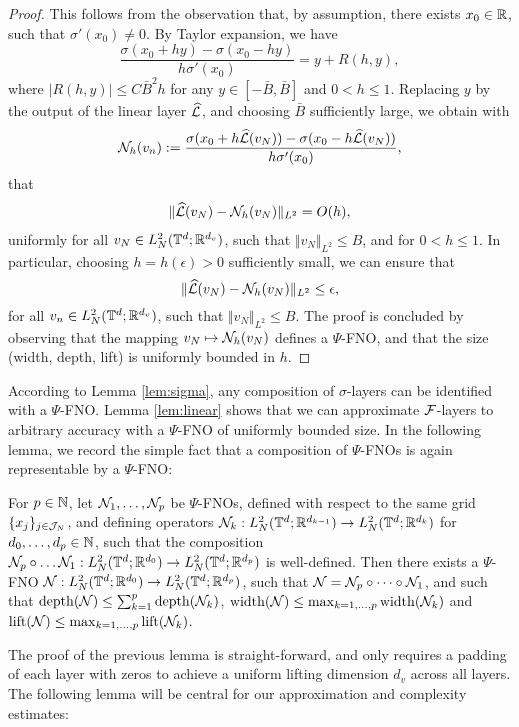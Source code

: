 \documentclass[reqno,a4paper]{amsart}
\begin{document}
\begin{proof}
This follows from the observation that, by assumption, there exists $x_0\in \mathbb{R}$, such that $\sigma'(x_0) \ne 0$. By Taylor expansion, we have
\[
\frac{\sigma(x_0 + hy) - \sigma(x_0-hy)}{h \sigma'(x_0)}
=
y + R(h,y),
\]
where $|R(h,y)|\le C\bar{B}^2 h$ for any $y\in [-\bar{B},\bar{B}]$ and $0<h\le 1$. Replacing $y$ by the output of the linear layer $\widehat{\mathcal{L}}$, and choosing $\bar{B}$ sufficiently large, we obtain with 
\[
\mathcal{N}_h(v_n) := \frac{\sigma(x_0 + h \widehat{\mathcal{L}}(v_N)) - \sigma(x_0-h \widehat{\mathcal{L}}(v_N))}{h \sigma'(x_0)},
\]
that
\begin{align*}
\Vert 
\widehat{\mathcal{L}}(v_N) - \mathcal{N}_h(v_N)
\Vert_{L^2}
=
O(h),
\end{align*}
uniformly for all $v_N \in L^2_N(\mathbb{T}^d;\mathbb{R}^{d_v})$, such that $\Vert v_N \Vert_{L^2}\le B$, and for $0<h\le 1$. In particular, choosing $h = h(\epsilon)>0$ sufficiently small, we can ensure that
\[
\Vert 
\widehat{\mathcal{L}}(v_N) - \mathcal{N}_h(v_N)
\Vert_{L^2}
\le
\epsilon,
\]
for all $v_n \in L^2_N(\mathbb{T}^d;\mathbb{R}^{d_v})$, such that $\Vert v_N \Vert_{L^2}\le B$. The proof is concluded by observing that the mapping $v_N \mapsto \mathcal{N}_h(v_N)$ defines a $\Psi$-FNO, and that the size (width, depth, lift) is uniformly bounded in $h$.
\end{proof}

According to Lemma \ref{lem:sigma}, any composition of $\sigma$-layers can be identified with a $\Psi$-FNO. Lemma \ref{lem:linear} shows that we can approximate $\mathcal{F}$-layers to arbitrary accuracy with a $\Psi$-FNO of uniformly bounded size. In the following lemma, we record the simple fact that a composition of $\Psi$-FNOs is again representable by a $\Psi$-FNO:

\begin{lemma}  \label{lem:composition}
For $p\in \mathbb{N}$, let $\mathcal{N}_1,\dots, \mathcal{N}_p$ be $\Psi$-FNOs, defined with respect to the same grid $\{x_j\}_{j\in \mathcal{J}_N}$, and defining operators $\mathcal{N}_k: L^2_N(\mathbb{T}^d; \mathbb{R}^{d_{k-1}}) \to L^2_N(\mathbb{T}^d;\mathbb{R}^{d_{k}})$ for $d_0,\dots, d_p \in \mathbb{N}$, such that the composition $\mathcal{N}_p\circ \dots \mathcal{N}_1: L^2_N(\mathbb{T}^d;\mathbb{R}^{d_0}) \to L^2_N(\mathbb{T}^d;\mathbb{R}^{d_p})$ is well-defined. Then there exists a $\Psi$-FNO $\mathcal{N}: L^2_N(\mathbb{T}^d;\mathbb{R}^{d_0}) \to L^2_N(\mathbb{T}^d;\mathbb{R}^{d_p})$, such that $\mathcal{N} = \mathcal{N}_p\circ \dots \circ \mathcal{N}_1$, and such that
$\mathrm{depth}(\mathcal{N}) \le \sum_{k=1}^p \mathrm{depth}(\mathcal{N}_k)$, $\mathrm{width}(\mathcal{N}) \le \max_{k=1,\dots, p} \mathrm{width}(\mathcal{N}_k)$ and  $\mathrm{lift}(\mathcal{N}) \le \max_{k=1,\dots, p} \mathrm{lift}(\mathcal{N}_k)$.
\end{lemma}

The proof of the previous lemma is straight-forward, and only requires a padding of each layer with zeros to achieve a uniform lifting dimension $d_v$ across all layers. The following lemma will be central for our approximation and complexity estimates:
\end{document}
